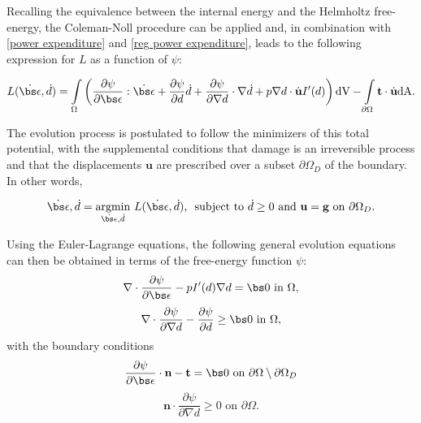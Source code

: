 Recalling the equivalence between the internal energy and the Helmholtz free-energy, the Coleman-Noll procedure can be applied and, in combination with \eqref{power expenditure} and \eqref{reg power expenditure}, leads to the following expression for $L$ as a function of $\psi$: 

\begin{equation}
    L(\dot{\bs\epsilon},\dot{d}) = \int\limits_{\Omega} \left( \dfrac{\partial\psi}{\partial\bs\epsilon}:\dot{\bs\epsilon} + \dfrac{\partial\psi}{\partial d}\dot{d}+\dfrac{\partial\psi}{\partial \nabla d}\cdot {\nabla \dot d} + p\nabla d \cdot\dot{\textbf{u}} I'(d) \right) \text{dV} - \int\limits_{\partial \Omega} \textbf{t}\cdot\dot{\textbf{u}} \text{dA}. 
\end{equation}

The evolution process is postulated to follow the minimizers of this total potential, with the supplemental conditions that damage is an irreversible process and that the displacements $\textbf{u}$ are prescribed over a subset $\partial \Omega_D$ of the boundary. In other words, 

\begin{equation}\label{minimization principle}
    \dot{\bs\epsilon}, \dot{d} = \underset{\dot{\bs\epsilon},\dot{d}}{{\operatorname{argmin}}} \ L(\dot{\bs\epsilon}, \dot{d}) \text{,\ \   subject to } \dot{d} \ge 0 \text{ and } \textbf{u}=\textbf{g} \text{ on }\partial \Omega_D. 
\end{equation}

\noindent Using the Euler-Lagrange equations, the following general evolution equations can then be obtained in terms of the free-energy function $\psi$:
\begin{equation}\label{u_equation}
    \nabla \cdot \dfrac{\partial\psi}{\partial \bs\epsilon} - pI'(d) \nabla d = \bs 0 \text{ in }\Omega,
\end{equation}
\begin{equation}\label{d_equation}
    \nabla \cdot \dfrac{\partial\psi}{\partial \nabla d} - \dfrac{\partial\psi}{\partial d} \ge \bs 0 \text{ in }\Omega,
\end{equation}
with the boundary conditions
\begin{equation}\label{u_bc_helmholtz}
    \dfrac{\partial\psi}{\partial \bs\epsilon}\cdot\textbf{n} - \textbf{t} = \bs 0 \text{ on }\partial\Omega\setminus\partial\Omega_D
\end{equation}
\begin{equation}\label{d_bc_helmholtz}
    \textbf{n} \cdot \dfrac{\partial\psi}{\partial \nabla d} \ge 0 \text{ on }\partial\Omega.
\end{equation}

